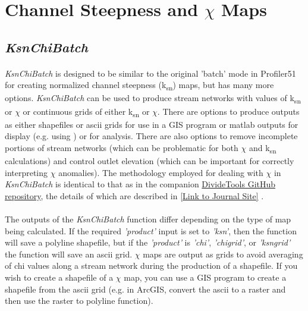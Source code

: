 \section{Channel Steepness and $\chi$ Maps}

\subsection{\textit{KsnChiBatch}} \label{sec:KsnBatch}
\paragraph{}\textit{KsnChiBatch} is designed to be similar to the original 'batch' mode in Profiler51 for creating normalized channel steepness (k\textsubscript{sn}) maps, but has many more options. \textit{KsnChiBatch} can be used to produce stream networks with values of k\textsubscript{sn}  or $\chi$ or continuous grids of either k\textsubscript{sn} or $\chi$. There are options to produce outputs as either shapefiles or ascii grids for use in a GIS program or matlab outputs for display (e.g. using ) or for analysis. There are also options to remove incomplete portions of stream networks (which can be problematic for both $\chi$ and k\textsubscript{sn} calculations) and control outlet elevation (which can be important for correctly interpreting $\chi$ anomalies). The methodology employed for dealing with $\chi$ in \textit{KsnChiBatch} is identical to that as in the companion \href{https://github.com/amforte/DivideTools}{DivideTools GitHub repository}, the details of which are described in \cite{Forte2018a} \href{https://www.sciencedirect.com/science/article/pii/S0012821X18302292}{[Link to Journal Site]} .

\paragraph{}The outputs of the \textit{KsnChiBatch} function differ depending on the type of map being calculated. If the required \textit{'product'} input is set to \textit{'ksn'}, then the function will save a polyline shapefile, but if the \textit{'product'} is \textit{'chi'}, \textit{'chigrid'}, or \textit{'ksngrid'} the function will save an ascii grid. $\chi$ maps are output as grids to avoid averaging of chi values along a stream network during the production of a shapefile. If you wish to create a shapefile of a $\chi$ map, you can use a GIS program to create a shapefile from the ascii grid (e.g. in ArcGIS, convert the ascii to a raster and then use the raster to polyline function).


